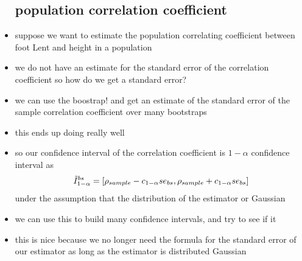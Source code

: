 \documentclass{article}
\begin{document}
\begin{itemize}
\subsection{population correlation coefficient}
\item suppose we want to estimate the population correlating coefficient between foot Lent and height in a population 
\item we do not have an estimate for the standard error of the correlation coefficient so how do we get a standard error?
\item we can use the boostrap! and get an estimate of the standard error of the sample correlation coefficient over many bootstraps
\item this ends up doing really well
\item so our confidence interval of the correlation coefficient is $1-\alpha$ confidence interval  as $$\Tilde{I}_{1-\alpha}^{bs}=[\rho_{sample}-c_{1-\alpha}se_{bs},\rho_{sample}+c_{1-\alpha}se_{bs}]$$ under the assumption that the distribution of the estimator or Gaussian 
\item we can use this to build many confidence intervals, and try to see if it 
\item this is nice because we no longer need the formula for the standard error of our estimator as long as the estimator is distributed Gaussian 
\end{itemize}
\end{document}
